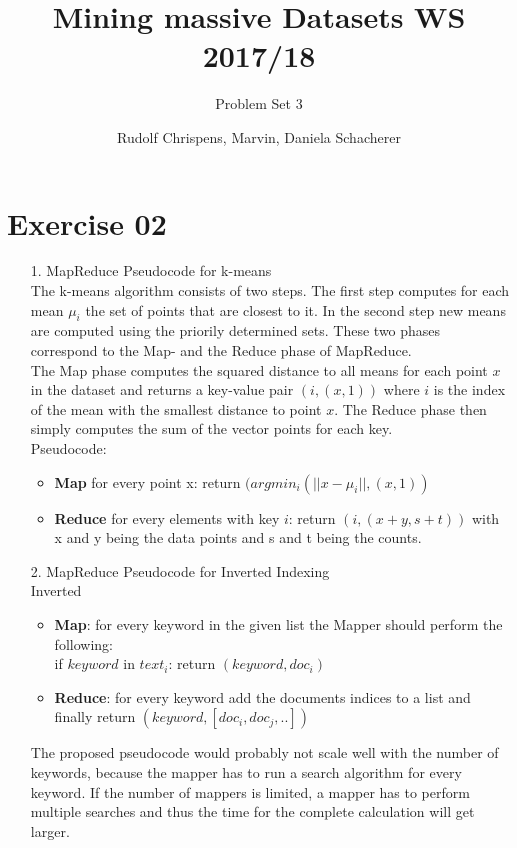 \documentclass[11pt,a4paper]{scrartcl}
\title{Mining massive Datasets WS 2017/18}
\subtitle{Problem Set 3}
\author{Rudolf Chrispens, Marvin, Daniela Schacherer}
\begin{document}
\maketitle

\section*{Exercise 02}

	\begin{itemize}
		\item[1.] MapReduce Pseudocode for k-means\\
		The k-means algorithm consists of two steps. The first step computes for each mean $\mu_i$ the set of points that are closest to it. In the second step new means are computed using the priorily determined sets. These two phases correspond to the Map- and the Reduce phase of MapReduce. \\
The Map phase computes the squared distance to all means for each point $x$ in the dataset and returns a key-value pair $(i, (x,1))$ where $i$ is the index of the mean with the smallest distance to point $x$. The Reduce phase then simply computes the sum of the vector points for each key. \\
Pseudocode:
\begin{itemize}
	\item \textbf{Map} for every point x: return $(argmin_i(|| x- \mu_i ||, (x,1))$
	\item \textbf{Reduce} for every elements with key $i$: return $(i, (x+y, s+t))$ with x and y being the data points and s and t being the counts.
\end{itemize}

		\item[2.] MapReduce Pseudocode for Inverted Indexing\\
		Inverted 
		\begin{itemize}
			\item \textbf{Map}: for every keyword in the given list the Mapper should perform the following: \\
		if $keyword$ in $text_i$: return $(keyword, doc_i)$
			\item \textbf{Reduce}: for every keyword add the documents indices to a list and finally return $(keyword, [doc_i, doc_j, ..])$
		\end{itemize}
		The proposed pseudocode would probably not scale well with the number of keywords, because the mapper has to run a search algorithm for every keyword. If the number of mappers is limited, a mapper has to perform multiple searches and thus the time for the complete calculation will get larger. 



\end{itemize}
\end{document}

